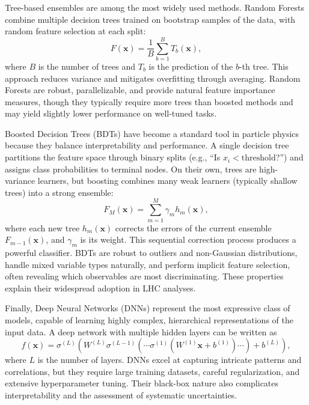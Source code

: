Tree-based ensembles are among the most widely used methods. Random Forests combine multiple decision trees trained on bootstrap samples of the data, with random feature selection at each split:
\begin{equation}
F(\mathbf{x}) = \frac{1}{B} \sum_{b=1}^{B} T_b(\mathbf{x}),
\end{equation}
where $B$ is the number of trees and $T_b$ is the prediction of the $b$-th tree. This approach reduces variance and mitigates overfitting through averaging. Random Forests are robust, parallelizable, and provide natural feature importance measures, though they typically require more trees than boosted methods and may yield slightly lower performance on well-tuned tasks.

Boosted Decision Trees (BDTs) have become a standard tool in particle physics because they balance interpretability and performance. A single decision tree partitions the feature space through binary splits (e.g., ``Is $x_i < \text{threshold}$?'') and assigns class probabilities to terminal nodes. On their own, trees are high-variance learners, but boosting combines many weak learners (typically shallow trees) into a strong ensemble:
\begin{equation}
F_M(\mathbf{x}) = \sum_{m=1}^{M} \gamma_m h_m(\mathbf{x}),
\end{equation}
where each new tree $h_m(\mathbf{x})$ corrects the errors of the current ensemble $F_{m-1}(\mathbf{x})$, and $\gamma_m$ is its weight. This sequential correction process produces a powerful classifier. BDTs are robust to outliers and non-Gaussian distributions, handle mixed variable types naturally, and perform implicit feature selection, often revealing which observables are most discriminating. These properties explain their widespread adoption in LHC analyses.

Finally, Deep Neural Networks (DNNs) represent the most expressive class of models, capable of learning highly complex, hierarchical representations of the input data. A deep network with multiple hidden layers can be written as
\begin{equation}
f(\mathbf{x}) = \sigma^{(L)}\left(W^{(L)} \sigma^{(L-1)}\left( \cdots \sigma^{(1)}(W^{(1)} \mathbf{x} + b^{(1)}) \cdots \right) + b^{(L)}\right),
\end{equation}
where $L$ is the number of layers. DNNs excel at capturing intricate patterns and correlations, but they require large training datasets, careful regularization, and extensive hyperparameter tuning. Their black-box nature also complicates interpretability and the assessment of systematic uncertainties.

